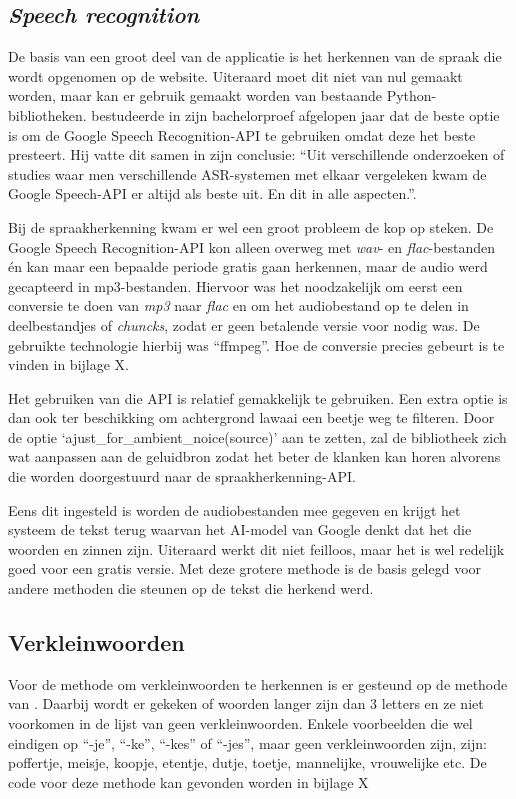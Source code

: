 \subsection{\textit{Speech recognition}}
De basis van een groot deel van de applicatie is het herkennen van de spraak die wordt opgenomen op de website. Uiteraard moet dit niet van nul gemaakt worden, maar kan er gebruik gemaakt worden van bestaande Python-bibliotheken. \textcite{Standaert2021} bestudeerde in zijn bachelorproef afgelopen jaar dat de beste optie is om de Google Speech Recognition-API te gebruiken omdat deze het beste presteert. Hij vatte dit samen in zijn conclusie: ``Uit verschillende onderzoeken of studies waar men verschillende ASR-systemen met elkaar vergeleken kwam de Google Speech-API er altijd als beste uit. En dit in alle aspecten.''.

Bij de spraakherkenning kwam er wel een groot probleem de kop op steken. De Google Speech Recognition-API kon alleen overweg met \textit{wav}- en \textit{flac}-bestanden én kan maar een bepaalde periode gratis gaan herkennen, maar de audio werd gecapteerd in mp3-bestanden. Hiervoor was het noodzakelijk om eerst een conversie te doen van \textit{mp3} naar \textit{flac} en om het audiobestand op te delen in deelbestandjes of \textit{chuncks}, zodat er geen betalende versie voor nodig was. De gebruikte technologie hierbij was ``ffmpeg''. Hoe de conversie precies gebeurt is te vinden in bijlage X.

Het gebruiken van die API is relatief gemakkelijk te gebruiken. Een extra optie is dan ook ter beschikking om achtergrond lawaai een beetje weg te filteren. Door de optie `ajust\_for\_ambient\_noice(source)' aan te zetten, zal de bibliotheek zich wat aanpassen aan de geluidbron zodat het beter de klanken kan horen alvorens die worden doorgestuurd naar de spraakherkenning-API.

Eens dit ingesteld is worden de audiobestanden mee gegeven en krijgt het systeem de tekst terug waarvan het AI-model van Google denkt dat het die woorden en zinnen zijn. Uiteraard werkt dit niet feilloos, maar het is wel redelijk goed voor een gratis versie. Met deze grotere methode is de basis gelegd voor andere methoden die steunen op de tekst die herkend werd.

\subsection{Verkleinwoorden}
Voor de methode om verkleinwoorden te herkennen is er gesteund op de methode van \textcite{Standaert2021}. Daarbij wordt er gekeken of woorden langer zijn dan 3 letters en ze niet voorkomen in de lijst van geen verkleinwoorden. Enkele voorbeelden die wel eindigen op ``-je'', ``-ke'', ``-kes'' of ``-jes'', maar geen verkleinwoorden zijn, zijn: poffertje, meisje, koopje, etentje, dutje, toetje, mannelijke, vrouwelijke etc. De code voor deze methode kan gevonden worden in bijlage X
